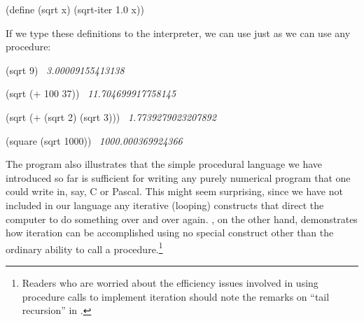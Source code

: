 \begin{codeBlock}
(define (sqrt x)
  (sqrt-iter 1.0 x))
\end{codeBlock}

\noindent
If we type these definitions to the interpreter, we can use  just as
we can use any procedure:

\begin{codeBlock}
(sqrt 9)
~\textit{3.00009155413138}~

(sqrt (+ 100 37))
~\textit{11.704699917758145}~

(sqrt (+ (sqrt 2) (sqrt 3)))
~\textit{1.7739279023207892}~

(square (sqrt 1000))
~\textit{1000.000369924366}~
\end{codeBlock}

\noindent
The  program also illustrates that the simple procedural language we
have introduced so far is sufficient for writing any purely numerical program
that one could write in, say, C or Pascal.  This might seem surprising, since
we have not included in our language any iterative (looping) constructs that
direct the computer to do something over and over again.  , on
the other hand, demonstrates how iteration can be accomplished using no special
construct other than the ordinary ability to call a procedure.\footnote{Readers
who are worried about the efficiency issues involved in using procedure calls
to implement iteration should note the remarks on ``tail recursion'' in
.}

